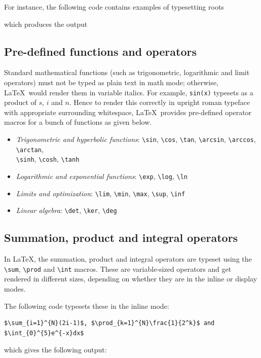		For instance, the following code contains examples of typesetting roots

		which produces the output
	
	\subsection{Pre-defined functions and operators}
		Standard mathematical functions (such as trigonometric, logarithmic and limit operators) must not be typed as plain text in math mode; otherwise, \LaTeX\ would render them in variable italics. For example, \lstinline|sin(x)| typesets as a product of $s$, $i$ and $n$. Hence to render this correctly in upright roman typeface with appropriate surrounding whitespace, \LaTeX\ provides pre-defined operator macros for a bunch of functions as given below.
		\begin{itemize}
			\item \emph{Trigonometric and hyperbolic functions}: \lstinline|\sin|, \lstinline|\cos|, \lstinline|\tan|, \lstinline|\arcsin|, \lstinline|\arccos|, \lstinline|\arctan|,\\ \lstinline|\sinh|, \lstinline|\cosh|, \lstinline|\tanh|
			
			\item \emph{Logarithmic and exponential functions}: \lstinline|\exp|, \lstinline|\log|, \lstinline|\ln|
			
			\item \emph{Limits and optimization}: \lstinline|\lim|, \lstinline|\min|, \lstinline|\max|, \lstinline|\sup|, \lstinline|\inf|
			
			\item \emph{Linear algebra}: \lstinline|\det|, \lstinline|\ker|, \lstinline|\deg|
		\end{itemize}
	
	\subsection{Summation, product and integral operators}
		In \LaTeX, the summation, product and integral operators are typeset using the \lstinline|\sum|, \lstinline|\prod| and \lstinline|\int| macros. These are variable-sized operators and get rendered in different sizes, depending on whether they are in the inline or display modes.
		
		The following code typesets these in the inline mode:
\begin{lstlisting}
$\sum_{i=1}^{N}(2i-1)$, $\prod_{k=1}^{N}\frac{1}{2^k}$ and $\int_{0}^{5}e^{-x}dx$
\end{lstlisting}
		which gives the following output:
		
